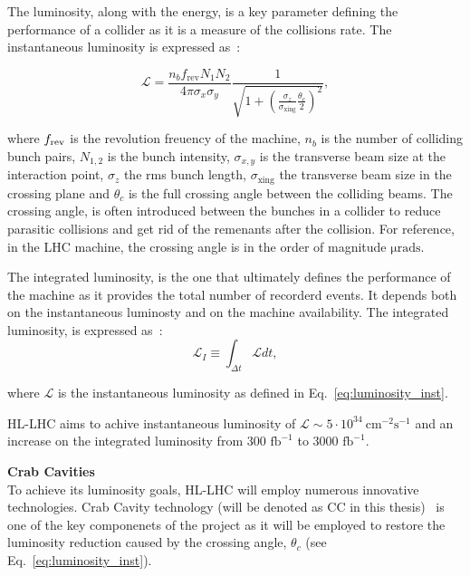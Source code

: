 The luminosity, along with the energy, is a key parameter defining the performance of a collider as it is a measure of the collisions rate. The instantaneous luminosity is expressed as~\cite{luminosity}:

\begin{equation}\label{eq:luminosity_inst}
    \mathcal{L} = \frac{n_b f_\mathrm{rev}N_1 N_2}{4 \pi \sigma_x \sigma_y} \frac{1}{\sqrt{1+(\frac{\sigma_z}{\sigma_\mathrm{xing}} \frac{\theta_c}{2})^2}},
\end{equation}

where ${f_\mathrm{rev}}$ is the revolution freuency of the machine, $n_b$ is the number of colliding bunch pairs, $N_{1,2}$ is the bunch intensity, $\sigma_{x,y}$ is the transverse beam size at the interaction point, $\sigma_z$ the rms bunch length, $\sigma_{\mathrm{xing}}$ the transverse beam size in the crossing plane and $\theta_c$ is the full crossing angle between the colliding beams. The crossing angle, is often introduced between the bunches in a collider to reduce parasitic collisions and get rid of the remenants after the collision. For reference, in the LHC machine, the crossing angle is in the order of magnitude $\mathrm{\mathrm{\mu rads}}$.


The integrated luminosity, is the one that ultimately defines the performance of the machine as it provides the total number of recorderd events. It depends both on the instantaneous luminosty and on the machine availability. The integrated luminosity, is expressed as~\cite{HL_LHC_yellow_report}:
\begin{equation}\label{eq:integrated_luminosity}
    \mathcal{L}_I \equiv \int_{\Delta t} \mathcal{L} dt,
\end{equation}

where $\mathcal{L}$ is the instantaneous luminosity as defined in Eq.~\eqref{eq:luminosity_inst}.

HL-LHC aims to achive instantaneous luminosity of $\mathcal{L} \sim 5 \cdot 10^{34} \ \mathrm{cm^{-2} s^{-1}}$ and an increase on the integrated luminosity from 300 $\mathrm{fb^{-1}}$ to 3000 $\mathrm{fb^{-1}}$. %

\normalsize{\textbf{Crab Cavities}}\\
To achieve its luminosity goals, HL-LHC will employ numerous innovative technologies. Crab Cavity technology (will be denoted as CC in this thesis)~\cite{Calaga:2673544} is one of the key componenets of the project as it will be employed to restore the luminosity reduction caused by the crossing angle, $\theta_c$ (see Eq.~\eqref{eq:luminosity_inst}).

